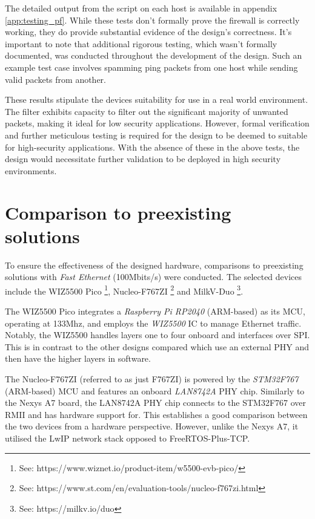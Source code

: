 The detailed output from the script on each host is available in appendix \ref{app:testing_pf}. While these tests don't formally prove the firewall is correctly working, they do provide substantial evidence of the design's correctness. It's important to note that additional rigorous testing, which wasn't formally documented, was conducted throughout the development of the design. Such an example test case involves spamming ping packets from one host while sending valid packets from another. 

These results stipulate the devices suitability for use in a real world environment. The filter exhibits capacity to filter out the significant majority of unwanted packets, making it ideal for low security applications. However, formal verification and further meticulous testing is required for the design to be deemed to suitable for high-security applications. With the absence of these in the above tests, the design would necessitate further validation to be deployed in high security environments. 








\section{Comparison to preexisting solutions}

To ensure the effectiveness of the designed hardware, comparisons to preexisting solutions with \textit{Fast Ethernet} (100Mbits/s) were conducted. The selected devices include the WIZ5500 Pico \footnote[1]{See: https://www.wiznet.io/product-item/w5500-evb-pico/}, Nucleo-F767ZI \footnote[2]{See: https://www.st.com/en/evaluation-tools/nucleo-f767zi.html} and MilkV-Duo \footnote[3]{See: https://milkv.io/duo}.

The WIZ5500 Pico integrates a \textit{Raspberry Pi RP2040} (ARM-based) as its MCU, operating at 133Mhz, and employs the \textit{WIZ5500} IC to manage Ethernet traffic. Notably, the WIZ5500 handles layers one to four onboard and interfaces over SPI. This is in contrast to the other designs compared which use an external PHY and then have the higher layers in software. 

The Nucleo-F767ZI (referred to as just F767ZI) is powered by the \textit{STM32F767} (ARM-based) MCU and features an onboard \textit{LAN8742A} PHY chip. Similarly to the Nexys A7 board, the LAN8742A PHY chip connects to the STM32F767 over RMII and has hardware support for. This establishes a good comparison between the two devices from a hardware perspective. However, unlike the Nexys A7, it utilised the LwIP network stack opposed to FreeRTOS-Plus-TCP. 


